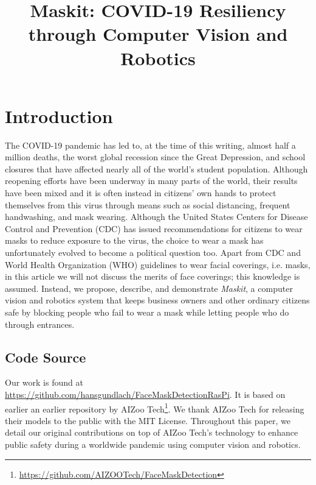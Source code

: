 \documentclass[conference, 12pt, onecolumn]{IEEEtran}
\date{}
\begin{document}
\title{Maskit: COVID-19 Resiliency through Computer Vision and Robotics}
\author{ 
\and
{}
}

\maketitle
\thispagestyle{plain}
\pagestyle{plain}
\tableofcontents
\newpage

\section{Introduction}
The COVID-19 pandemic has led to, at the time of this writing, almost half a million deaths, the worst global recession since the Great Depression, and school closures that have affected nearly all of the world's student population. Although reopening efforts have been underway in many parts of the world, their results have been mixed and it is often instead in citizens' own hands to protect themselves from this virus through means such as social distancing, frequent handwashing, and mask wearing. Although the United States Centers for Disease Control and Prevention (CDC) has issued recommendations for citizens to wear masks to reduce exposure to the virus, the choice to wear a mask has unfortunately evolved to become a political question too\cite{brandon_2020, vigdor_2020}. Apart from CDC and World Health Organization (WHO) guidelines to wear facial coverings, i.e. masks, in this article we will not discuss the merits of face coverings; this knowledge is assumed. Instead, we propose, describe, and demonstrate \textit{Maskit}, a computer vision and robotics system that keeps business owners and other ordinary citizens safe by blocking people who fail to wear a mask while letting people who do through entrances.
\subsection{Code Source}
Our work is found at \url{https://github.com/hansgundlach/FaceMaskDetectionRasPi}. It is based on earlier an earlier repository by AIZoo Tech\footnote{\url{https://github.com/AIZOOTech/FaceMaskDetection}}. We thank AIZoo Tech for releasing their models to the public with the MIT License. Throughout this paper, we detail our original contributions on top of AIZoo Tech's technology to enhance public safety during a worldwide pandemic using computer vision and robotics.
\end{document}
